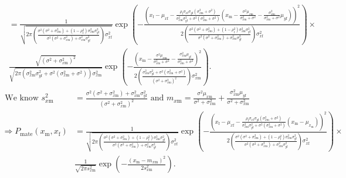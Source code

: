 \documentclass{article}
\newcommand{\x}[1]{\text{#1}}
\begin{document}
\begin{pf}
\begin{enumerate}
\begin{align*}
\\&=\frac{1}{\sqrt{2\pi \left(\frac{\sigma^2(\sigma^2+\sigma_{x\x{m}}^2)+(1-\rho_\x{f}^2)\sigma_{x\x{m}}^2\sigma_{y\x{f}}^2}{\sigma^2(\sigma^2+\sigma_{x\x{m}}^2)+\sigma_{x\x{m}}^2\sigma_{y\x{f}}^2}\right)\sigma_{x\x{f}}^2}}\exp\left(-\frac{\left(x_\x{f}-\mu_{x\x{f}}-\frac{\rho_\x{f}\sigma_{x\x{f}}\sigma_{y\x{f}}(\sigma_{x\x{m}}^2+\sigma^2)}{\sigma_{x\x{m}}^2\sigma_{y\x{f}}^2+\sigma^2(\sigma_{x\x{m}}^2+\sigma^2)}\left(x_\x{m}-\frac{\sigma^2\mu_{x\x{m}}}{\sigma_{x\x{m}}^2+\sigma^2}-\frac{\sigma_{x\x{m}}^2}{\sigma_{x\x{m}}^2+\sigma^2}\mu_{y\x{f}}\right)\right)^2}{2\left(\frac{\sigma^2(\sigma^2+\sigma_{x\x{m}}^2)+(1-\rho_\x{f}^2)\sigma_{x\x{m}}^2\sigma_{y\x{f}}^2}{\sigma^2(\sigma^2+\sigma_{x\x{m}}^2)+\sigma_{x\x{m}}^2\sigma_{y\x{f}}^2}\right)\sigma_{x\x{f}}^2}\right)\times
\\&\frac{\sqrt{(\sigma^2+\sigma_{x\x{m}}^2)^2}}{\sqrt{2\pi(\sigma_{x\x{m}}^2\sigma_{y\x{f}}^2+\sigma^2(\sigma_{x\x{m}}^2+\sigma^2))\sigma_{x\x{m}}^2}}\exp\left(-\frac{\left(x_\x{m}-\frac{\sigma^2\mu_{x\x{m}}}{\sigma_{x\x{m}}^2+\sigma^2}-\frac{\sigma_{x\x{m}}^2\mu_{y\x{f}}}{\sigma_{x\x{m}}^2+\sigma^2}\right)^2}{2\left(\frac{\sigma_{x\x{m}}^2\sigma_{y\x{f}}^2+\sigma^2(\sigma_{x\x{m}}^2+\sigma^2)}{(\sigma^2+\sigma_{x\x{m}}^2)^2}\right)\sigma_{x\x{m}}^2}\right).
\end{align*}
\begin{align*}
\text{ We know } s_{x\x{m}}^2&=\frac{\sigma^2(\sigma^2+\sigma_{x\x{m}}^2)+\sigma_{x\x{m}}^2\sigma_{y\x{f}}^2}{(\sigma^2+\sigma_{x\x{m}}^2)^2} \text{ and } m_{x\x{m}}=\frac{\sigma^2\mu_{x\x{m}}}{\sigma^2+\sigma_{x\x{m}}^2}+\frac{\sigma_{x\x{m}}^2\mu_{y\x{f}}}{\sigma^2+\sigma_{x\x{m}}^2}
\\\Rightarrow P_\text{mate}(x_\x{m},x_\x{f})&=\frac{1}{\sqrt{2\pi \left(\frac{\sigma^2(\sigma^2+\sigma_{x\x{m}}^2)+(1-\rho_\x{f}^2)\sigma_{x\x{m}}^2\sigma_{y\x{f}}^2}{\sigma^2(\sigma^2+\sigma_{x\x{m}}^2)+\sigma_{x\x{m}}^2\sigma_{y\x{f}}^2}\right)\sigma_{x\x{f}}^2}}\exp\left(-\frac{\left(x_\x{f}-\mu_{x\x{f}}-\frac{\rho_\x{f}\sigma_{x\x{f}}\sigma_{y\x{f}}(\sigma_{x\x{m}}^2+\sigma^2)}{\sigma_{x\x{m}}^2\sigma_{y\x{f}}^2+\sigma^2(\sigma_{x\x{m}}^2+\sigma^2)}\left(x_\x{m}-\mu_{x_\x{m}}\right)\right)^2}{2\left(\frac{\sigma^2(\sigma^2+\sigma_{x\x{m}}^2)+(1-\rho_\x{f}^2)\sigma_{x\x{m}}^2\sigma_{y\x{f}}^2}{\sigma^2(\sigma^2+\sigma_{x\x{m}}^2)+\sigma_{x\x{m}}^2\sigma_{y\x{f}}^2}\right)\sigma_{x\x{f}}^2}\right)\times
\\&\frac{1}{\sqrt{2\pi s_{x\x{m}}^2}}\exp\left(-\frac{\left(x_\x{m}-m_{x\x{m}}\right)^2}{2s_{x\x{m}}^2}\right).

\end{align*}
\end{enumerate}
\end{pf}
\end{document}
